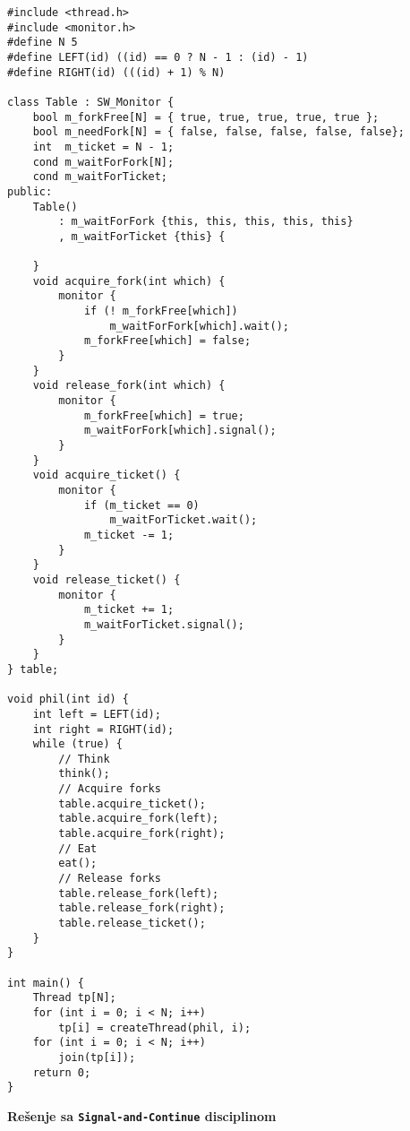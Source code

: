 \begin{lstlisting}
#include <thread.h>
#include <monitor.h>
#define N 5
#define LEFT(id) ((id) == 0 ? N - 1 : (id) - 1)
#define RIGHT(id) (((id) + 1) % N)

class Table : SW_Monitor {
    bool m_forkFree[N] = { true, true, true, true, true };
    bool m_needFork[N] = { false, false, false, false, false};
    int  m_ticket = N - 1;
    cond m_waitForFork[N];
    cond m_waitForTicket;
public:
    Table() 
        : m_waitForFork {this, this, this, this, this}
        , m_waitForTicket {this} {
        
    }
    void acquire_fork(int which) {
        monitor {
            if (! m_forkFree[which])
                m_waitForFork[which].wait();
            m_forkFree[which] = false;
        }
    }
    void release_fork(int which) {
        monitor {
            m_forkFree[which] = true;
            m_waitForFork[which].signal();
        }
    }
    void acquire_ticket() {
        monitor {
            if (m_ticket == 0)
                m_waitForTicket.wait();
            m_ticket -= 1;
        }
    }
    void release_ticket() {
        monitor {
            m_ticket += 1;
            m_waitForTicket.signal();
        }
    }
} table;

void phil(int id) {
    int left = LEFT(id);
    int right = RIGHT(id);
    while (true) {
        // Think
        think();
        // Acquire forks
        table.acquire_ticket();
        table.acquire_fork(left);
        table.acquire_fork(right);
        // Eat
        eat();
        // Release forks
        table.release_fork(left);
        table.release_fork(right);
        table.release_ticket();
    }
}

int main() {
    Thread tp[N];
    for (int i = 0; i < N; i++) 
        tp[i] = createThread(phil, i);
    for (int i = 0; i < N; i++) 
        join(tp[i]);
    return 0;
}

\end{lstlisting}
\textbf{Re\v{s}enje sa \texttt{Signal-and-Continue} disciplinom}
